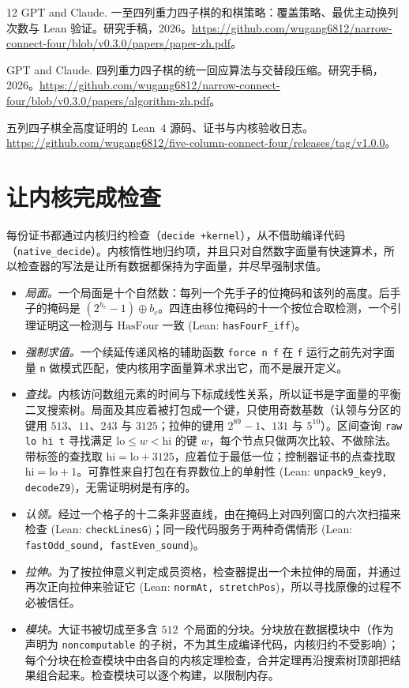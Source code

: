 \documentclass[11pt,a4paper]{article}
\theoremstyle{zhthm}
\newcommand{\code}[1]{{\upshape\texttt{\small\nolinkurl{#1}}}}
\newcommand{\leanref}[1]{(Lean: \code{#1})}
\newcommand{\HasFour}{\mathrm{HasFour}}
\begin{document}
\begin{thebibliography}{12}
{\latinrm GPT and Claude.}
\newblock 一至四列重力四子棋的和棋策略：覆盖策略、最优主动换列次数与 Lean 验证。研究手稿，2026。\url{https://github.com/wugang6812/narrow-connect-four/blob/v0.3.0/papers/paper-zh.pdf}。

{\latinrm GPT and Claude.}
\newblock 四列重力四子棋的统一回应算法与交替段压缩。研究手稿，2026。\url{https://github.com/wugang6812/narrow-connect-four/blob/v0.3.0/papers/algorithm-zh.pdf}。

五列四子棋全高度证明的 Lean~4 源码、证书与内核验收日志。\url{https://github.com/wugang6812/five-column-connect-four/releases/tag/v1.0.0}。

\end{thebibliography}

\appendix

\section{让内核完成检查}
\label{app:kernel}

每份证书都通过内核归约检查（\code{decide +kernel}），从不借助编译代码（\code{native_decide}）。内核惰性地归约项，并且只对自然数字面量有快速算术，所以检查器的写法是让所有数据都保持为字面量，并尽早强制求值。

\begin{itemize}
  \item \emph{局面。}一个局面是十个自然数：每列一个先手子的位掩码和该列的高度。后手子的掩码是 $(2^{h_c}-1)\oplus b_c$。四连由移位掩码的十一个按位合取检测，一个引理证明这一检测与 $\HasFour$ 一致 \leanref{hasFourF_iff}。
  \item \emph{强制求值。}一个续延传递风格的辅助函数 \code{force n f} 在 \code{f} 运行之前先对字面量 \code{n} 做模式匹配，使内核用字面量算术求出它，而不是展开定义。
  \item \emph{查找。}内核访问数组元素的时间与下标成线性关系，所以证书是字面量的平衡二叉搜索树。局面及其应着被打包成一个键，只使用奇数基数（认领与分区的键用 $513$、$11$、$243$ 与 $3125$；拉伸的键用 $2^{89}-1$、$131$ 与 $5^{10}$）。区间查询 \code{raw lo hi t} 寻找满足 $\mathrm{lo}\le w<\mathrm{hi}$ 的键 $w$，每个节点只做两次比较、不做除法。带标签的查找取 $\mathrm{hi}=\mathrm{lo}+3125$，应着位于最低一位；控制器证书的点查找取 $\mathrm{hi}=\mathrm{lo}+1$。可靠性来自打包在有界数位上的单射性 \leanref{unpack9_key9, decodeZ9}，无需证明树是有序的。
  \item \emph{认领。}经过一个格子的十二条非竖直线，由在掩码上对四列窗口的六次扫描来检查 \leanref{checkLinesG}；同一段代码服务于两种奇偶情形 \leanref{fastOdd_sound, fastEven_sound}。
  \item \emph{拉伸。}为了按拉伸意义判定成员资格，检查器提出一个未拉伸的局面，并通过再次正向拉伸来验证它 \leanref{normAt, stretchPos}，所以寻找原像的过程不必被信任。
  \item \emph{模块。}大证书被切成至多含 $512$~个局面的分块。分块放在数据模块中（作为声明为 \code{noncomputable} 的子树，不为其生成编译代码，内核归约不受影响）；每个分块在检查模块中由各自的内核定理检查，合并定理再沿搜索树顶部把结果组合起来。检查模块可以逐个构建，以限制内存。
\end{itemize}
\end{document}

